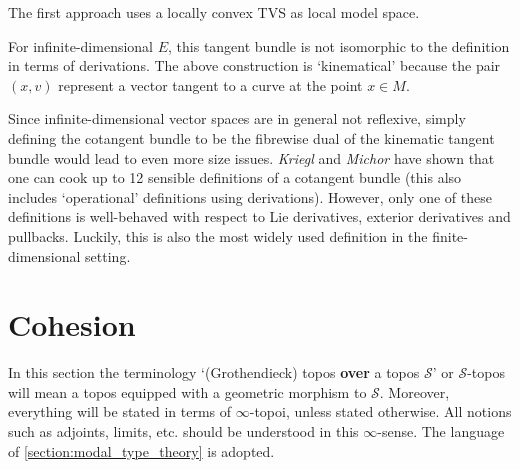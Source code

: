     The first approach uses a locally convex TVS as local model space.

    \begin{remark}
        For infinite-dimensional $E$, this tangent bundle is not isomorphic to the definition in terms of derivations. The above construction is `kinematical' because the pair $(x,v)$ represent a vector tangent to a curve at the point $x\in M$.
    \end{remark}

    Since infinite-dimensional vector spaces are in general not reflexive, simply defining the cotangent bundle to be the fibrewise dual of the kinematic tangent bundle would lead to even more size issues. \textit{Kriegl} and \textit{Michor} have shown that one can cook up to 12 sensible definitions of a cotangent bundle (this also includes `operational' definitions using derivations). However, only one of these definitions is well-behaved with respect to Lie derivatives, exterior derivatives and pullbacks. Luckily, this is also the most widely used definition in the finite-dimensional setting.

    \section{Cohesion}\label{section:cohesion}

    In this section the terminology `(Grothendieck) topos \textbf{over} a topos $\mathcal{S}$' or $\mathcal{S}$-topos will mean a topos equipped with a geometric morphism to $\mathcal{S}$. Moreover, everything will be stated in terms of $\infty$-topoi, unless stated otherwise. All notions such as adjoints, limits, etc. should be understood in this $\infty$-sense. The language of \cref{section:modal_type_theory} is adopted.

